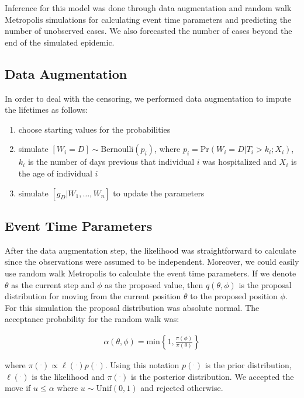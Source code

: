 \documentclass[12pt]{article}
\begin{document}
Inference for this model was done through data augmentation and
random walk Metropolis simulations for calculating event time
parameters and predicting the number of unobserved cases.  We also forecasted the number of cases beyond the end of the simulated epidemic.


\subsection{Data Augmentation}
\label{subsec:dataAugmentation}

In order to deal with the censoring, we performed data augmentation
to impute the lifetimes as follows:

\begin{enumerate}

\item choose starting values for the probabilities

\item simulate $[W_i = D ] \sim \mbox{Bernoulli}(p_i)$, where $p_i = \mbox{Pr}(W_i = D | T_i > k_i; X_i)$,
 $k_i$ is the number of days previous that individual $i$ was hospitalized and $X_i$ is the age of individual $i$

\item simulate $[g_D|W_1, \ldots, W_n]$ to update
the parameters

\end{enumerate}

\subsection{Event Time Parameters}
\label{subsec:eventTimeParams}

After the data augmentation step, the likelihood was straightforward
to calculate since the observations were assumed to be independent.
Moreover, we could easily use random walk Metropolis to calculate
the event time parameters.
 If we denote $\theta$ as the current step and $\phi$ as
the proposed value, then $q(\theta, \phi)$ is the proposal
distribution for moving from the current position $\theta$ to the
proposed position $\phi$. For this simulation the proposal
distribution was absolute normal. The acceptance probability for the
random walk was:

\begin{eqnarray*}
\alpha(\theta, \phi) =  \mbox{min}\left\{1,
\frac{\pi(\phi)}{\pi(\theta)}\right\}
\end{eqnarray*}

\noindent where $\pi(^.) \propto \ell(^.) p(^.)$.  Using this
notation $p(^.)$ is the prior distribution, $\ell(^.)$ is the
likelihood and
 $\pi(^.)$ is the posterior distribution.  We accepted the move if $u \leq \alpha$ where $u \sim \mbox{Unif}(0, 1)$ and rejected otherwise.
\end{document}
